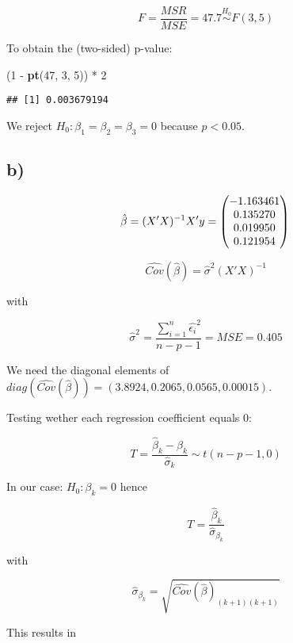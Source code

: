 \documentclass[]{article}
\newenvironment{Shaded}{\begin{snugshade}}{\end{snugshade}}
\newcommand{\KeywordTok}[1]{\textcolor[rgb]{0.13,0.29,0.53}{\textbf{{#1}}}}
\newcommand{\DecValTok}[1]{\textcolor[rgb]{0.00,0.00,0.81}{{#1}}}
\newcommand{\StringTok}[1]{\textcolor[rgb]{0.31,0.60,0.02}{{#1}}}
\newcommand{\NormalTok}[1]{{#1}}
\begin{document}
\[
F = \frac{MSR}{MSE} = 47.7 \overset{H_0}{\sim}F(3,5)
\]

To obtain the (two-sided) p-value:

\begin{Shaded}
\begin{Highlighting}[]
\NormalTok{(}\DecValTok{1} \NormalTok{-}\StringTok{ }\KeywordTok{pt}\NormalTok{(}\DecValTok{47}\NormalTok{, }\DecValTok{3}\NormalTok{, }\DecValTok{5}\NormalTok{)) *}\StringTok{ }\DecValTok{2}
\end{Highlighting}
\end{Shaded}

\begin{verbatim}
## [1] 0.003679194
\end{verbatim}

We reject \(H_0: \beta_1 = \beta_2 = \beta_3 = 0\) because \(p < 0.05\).

\subsection{b)}\label{b}

\[
\hat{\beta} = (X'X)^{-1}X'y =
\begin{pmatrix}
-1.163461\\
0.135270\\
0.019950\\
0.121954\\
\end{pmatrix}\\
\]

\[
\widehat{Cov}(\hat{\beta}) = \hat{\sigma}^2(X'X)^{-1}
\]

with

\[
\hat{\sigma}^2 = \frac{\sum_{i = 1}^n \hat{\epsilon_i}^2}{n - p - 1} = MSE = 0.405
\]

We need the diagonal elements of
\(diag(\widehat{Cov}(\hat{\beta})) = (3.8924, 0.2065, 0.0565, 0.00015)\).

Testing wether each regression coefficient equals 0:

\[
T = \frac{\hat{\beta}_k - \beta_k}{\hat{\sigma}_k} \sim t(n - p - 1, 0)
\]

In our case: \(H_0:\beta_k = 0\) hence

\[T = \frac{\hat{\beta}_k}{\hat{\sigma}_{\beta_k}}\]

with

\[
\hat{\sigma}_{\beta_k} = \sqrt{\widehat{Cov}(\hat{\beta})_{(k+1)(k+1)}}
\]

This results in
\end{document}
